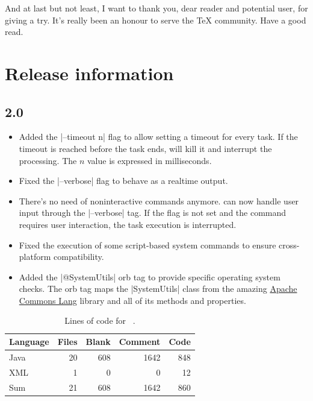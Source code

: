 \documentclass[a4paper,twoside,12pt]{memoir}
\begin{document}
And at last but not least, I want to thank you, dear reader and potential user, 
for giving \arara a try. It's really been an honour to serve the \TeX{}
community. Have a good read.

\cleardoublepage

\section*{Release information}

\subsection*{2.0}
\begin{itemize}
\item[\featurenew] 
     Added the |--timeout n| flag to allow setting a timeout for every task. If
     the timeout is reached before the task ends, \arara will kill it and 
     interrupt the processing. The $n$ value is expressed in milliseconds.
\item[\featurefixed] 
     Fixed the |--verbose| flag to behave as a realtime output.
\item[\featurenew] 
     There's no need of noninteractive commands anymore. \arara can now handle
     user input through the |--verbose| tag. If the flag is not set and the 
     command requires user interaction, the task execution is interrupted.
\item[\featurefixed] 
     Fixed the execution of some script-based system commands to ensure 
     cross-platform compatibility.
\item[\featurenew] 
     Added the |@{SystemUtils}| orb tag to provide specific operating system 
     checks. The orb tag maps the |SystemUtils| class from the amazing 
     \href{http://commons.apache.org/lang/}{Apache Commons Lang} library and 
     all of its methods and properties.
\end{itemize}

{\renewcommand{\arraystretch}{1.5}
\begin{table}[ht]
\centering
\begin{tabular}{lrrrr}
\hline
\textbf{Language} & \textbf{Files} & \textbf{Blank} & \textbf{Comment} & \textbf{Code}\\
\hline
\hline
Java & 20 & 608 & 1642 & 848\\
XML & 1 & 0 & 0 & 12\\
\hline
Sum & 21 & 608 & 1642 & 860\\
\hline
\end{tabular}
\caption{Lines of code for \arara\ .}
\label{tab:locarara20}
\end{table}}
\end{document}
